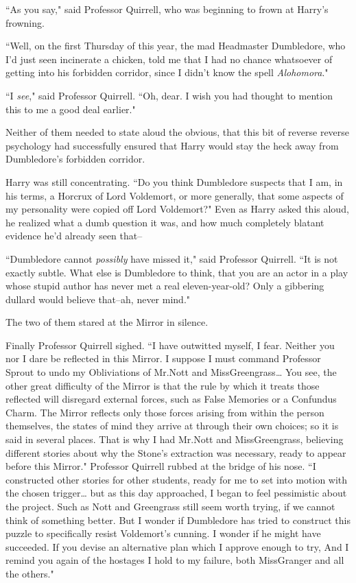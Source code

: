 ``As you say," said Professor Quirrell, who was beginning to frown at Harry's frowning.

``Well, on the first Thursday of this year, the mad Headmaster Dumbledore, who I'd just seen incinerate a chicken, told me that I had no chance whatsoever of getting into his forbidden corridor, since I didn't know the spell \emph{Alohomora}."

``I \emph{see}," said Professor Quirrell. ``Oh, dear. I wish you had thought to mention this to me a good deal earlier."

Neither of them needed to state aloud the obvious, that this bit of reverse reverse psychology had successfully ensured that Harry would stay the heck away from Dumbledore's forbidden corridor.

Harry was still concentrating. ``Do you think Dumbledore suspects that I am, in his terms, a Horcrux of Lord Voldemort, or more generally, that some aspects of my personality were copied off Lord Voldemort?" Even as Harry asked this aloud, he realized what a dumb question it was, and how much completely blatant evidence he'd already seen that\---

``Dumbledore cannot \emph{possibly} have missed it," said Professor Quirrell. ``It is not exactly subtle. What else is Dumbledore to think, that you are an actor in a play whose stupid author has never met a real eleven-year-old? Only a gibbering dullard would believe that\---ah, never mind."

The two of them stared at the Mirror in silence.

Finally Professor Quirrell sighed. ``I have outwitted myself, I fear. Neither you nor I dare be reflected in this Mirror. I suppose I must command Professor Sprout to undo my Obliviations of Mr.\?Nott and Miss\?Greengrass{\ldots} You see, the other great difficulty of the Mirror is that the rule by which it treats those reflected will disregard external forces, such as False Memories or a Confundus Charm. The Mirror reflects only those forces arising from within the person themselves, the states of mind they arrive at through their own choices; so it is said in several places. That is why I had Mr.\?Nott and Miss\?Greengrass, believing different stories about why the Stone's extraction was necessary, ready to appear before this Mirror." Professor Quirrell rubbed at the bridge of his nose. ``I constructed other stories for other students, ready for me to set into motion with the chosen trigger{\ldots} but as this day approached, I began to feel pessimistic about the project. Such as Nott and Greengrass still seem worth trying, if we cannot think of something better. But I wonder if Dumbledore has tried to construct this puzzle to specifically resist Voldemort's cunning. I wonder if he might have succeeded. If you devise an alternative plan which I approve enough to try,  And I remind you again of the hostages I hold to my failure, both Miss\?Granger and all the others."

